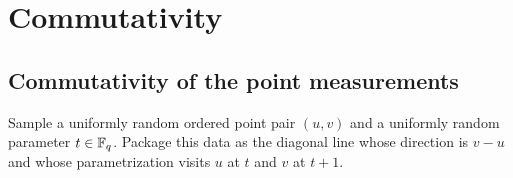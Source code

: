 \chapter{Commutativity}
\label{chap:commutativity}
\label{sec:g-comm}

\section{Commutativity of the point measurements}
\label{sec:commutativity-points}

\begin{definition}\label{def:point-pair-shared-diagonal-line-distribution}
	\leanok
	Sample a uniformly random ordered point pair $(u,v)$ and a uniformly random
	parameter $t \in \mathbb{F}_q$. Package this data as the diagonal line whose direction
	is $v-u$ and whose parametrization visits $u$ at $t$ and $v$ at $t+1$.
\end{definition}

